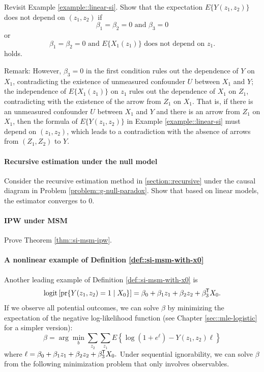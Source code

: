 Revisit Example \ref{example::linear-si}. Show that the expectation $E\{ Y(z_1, z_2) \} $ does not depend on $(z_1, z_2)$ if
$$
\beta_1  = \beta_2 = 0  \text{ and }   \beta_3 = 0
$$
or 
$$
\beta_1 = \beta_2 = 0 \text{ and } E\{ X_1(z_1)\}  \text{ does not depend on } z_1.
$$
holds. 


Remark: 
However, $\beta_3 = 0$ in the first condition rules out the dependence of $Y$ on $X_1$, contradicting the existence of unmeasured confounder $U$ between $X_1$ and $Y$; the independence of $E\{ X_1(z_1)\} $ on $z_1$ rules out the dependence of $X_1$ on $Z_1$, contradicting with the existence of the arrow from $Z_1$ on $X_1$. That is, if there is an unmeasured confounder $U$ between $X_1$ and $Y$ and there is an arrow from $Z_1$ on $X_1$, then the formula of $E\{ Y(z_1, z_2) \} $ in Example \ref{example::linear-si} must depend on $(z_1, z_2)$, which leads to a contradiction with the absence of arrows from $(Z_1, Z_2)$ to $Y$.  


\paragraph{Recursive estimation under the null model}\label{problem::recursive-null}


Consider the recursive estimation method in \ref{section::recursive} under the causal diagram in Problem \ref{problem::g-null-paradox}. 
Show that based on linear models, the estimator converges to 0. 



\paragraph{IPW under MSM}\label{problem::ipw-msm}


Prove Theorem \ref{thm::si-msm-ipw}. 


\paragraph{A nonlinear example of Definition \ref{def::si-msm-with-x0}}\label{hw::logistic-msm}


Another leading example of Definition \ref{def::si-msm-with-x0} is 
\begin{equation}\label{eq::logistic-msm}
\text{logit} \left[ \pr\{  Y(z_1, z_2)  =1  \mid X_0\}  \right] = \beta_0 + \beta_1 z_1 + \beta_2 z_2 + \beta_3\tran X_0 .
\end{equation}
If we observe all potential outcomes, we can solve $\beta$ by minimizing the expectation of the negative log-likelihood function (see Chapter \ref{sec::mle-logistic} for a simpler version):
\begin{equation}
\label{eq::beta-logistic}
\beta = \arg\min_b   \sum_{z_2}\sum_{z_1}  E\left\{   \log (1 + e^{\ell })
- Y(z_1, z_2)  \ell  \right\}
\end{equation}
where $\ell = \beta_0 + \beta_1 z_1 + \beta_2 z_2 + \beta_3^{\mkern-1.5mu\mathsf{T}} X_0.$
Under sequential ignorability, we can solve $\beta$ from the following minimization problem that only involves observables.


